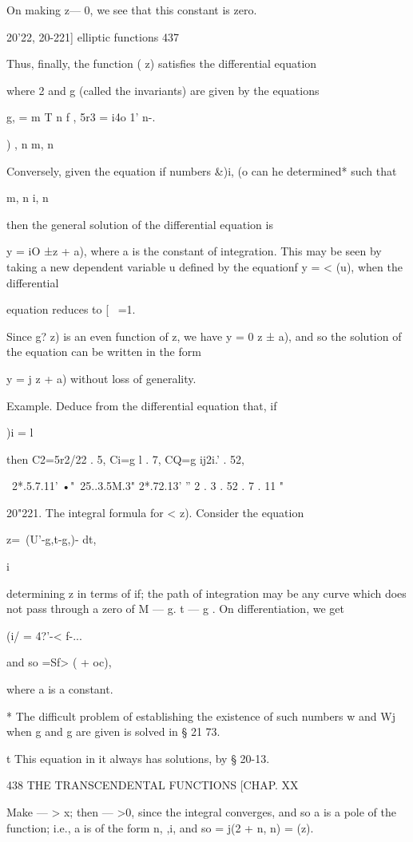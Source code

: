 {On making z— 0, we see that this constant is zero.

20'22, 20-221] elliptic functions 437

Thus, finally, the function ( z) satisfies the differential equation

where 2 and g (called the invariants) are given by the equations

g, = m T n f , 5r3 = i4o 1' n-.

) , n m, n

Conversely, given the equation if numbers \&)i, (o can he determined*
such that

m, n i, n

then the general solution of the differential equation is

y = iO ±z + a), where a is the constant of integration. This may be
seen by taking a new dependent variable u defined by the equationf y =
< (u), when the differential

equation reduces to [ \ =1.

Since g? z) is an even function of z, we have y = 0 z ± a), and so the
solution of the equation can be written in the form

y = j z + a) without loss of generality.

Example. Deduce from the differential equation that, if

)i = l

then C2=5r2/22 . 5, Ci=g l . 7, CQ=g ij2i.' . 52,

 ~2*.5.7.11' •"~25..3.5M.3" 2*.72.13' '' 2 . 3 . 52 . 7 . 11 "

20"221. The integral formula for < z). Consider the equation

z=\ (U'-g,t-g,)- dt,

  i

determining z in terms of if; the path of integration may be any
curve which does not pass through a zero of M — g. t — g . On
differentiation, we get

(i/ = 4?'-< f-...

and so =Sf> ( + oc),

where a is a constant.

* The difficult problem of establishing the existence of such numbers
w and Wj when g and g are given is solved in § 21 73.

t This equation in it always has solutions, by § 20-13.

438 THE TRANSCENDENTAL FUNCTIONS [CHAP. XX

Make — > x; then — >0, since the integral converges, and so a is a
pole of the function; i.e., a is of the form n, ,i, and so = j(2 + n,
n) = (z).

}
